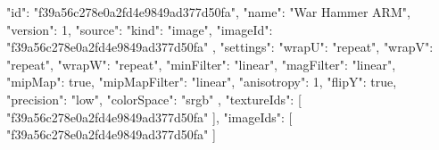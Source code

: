 {
  "id": "f39a56c278e0a2fd4e9849ad377d50fa",
  "name": "War Hammer ARM",
  "version": 1,
  "source": {
    "kind": "image",
    "imageId": "f39a56c278e0a2fd4e9849ad377d50fa"
  },
  "settings": {
    "wrapU": "repeat",
    "wrapV": "repeat",
    "wrapW": "repeat",
    "minFilter": "linear",
    "magFilter": "linear",
    "mipMap": true,
    "mipMapFilter": "linear",
    "anisotropy": 1,
    "flipY": true,
    "precision": "low",
    "colorSpace": "srgb"
  },
  "textureIds": [
    "f39a56c278e0a2fd4e9849ad377d50fa"
  ],
  "imageIds": [
    "f39a56c278e0a2fd4e9849ad377d50fa"
  ]
}
